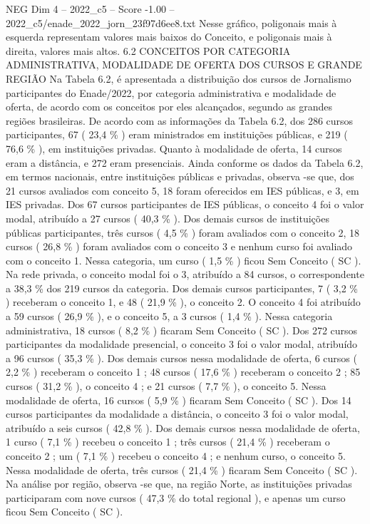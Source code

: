 \begin{textsample}{NEG Dim 4 – 2022\_c5 – Score -1.00 – 2022\_c5/enade\_2022\_jorn\_23f97d6ee8.txt}
Nesse gráfico, poligonais mais à esquerda representam valores mais baixos do Conceito, e poligonais mais à direita, valores mais altos. 6.2 CONCEITOS POR CATEGORIA ADMINISTRATIVA, MODALIDADE DE OFERTA DOS CURSOS E GRANDE REGIÃO Na Tabela 6.2, é apresentada a distribuição dos cursos de Jornalismo participantes do Enade/2022, por categoria administrativa e modalidade de oferta, de acordo com os conceitos por eles alcançados, segundo as grandes regiões brasileiras.
De acordo com as informações da Tabela 6.2, dos 286 cursos participantes, 67 ( 23,4 \% ) eram ministrados em instituições públicas, e 219 ( 76,6 \% ), em instituições privadas.
Quanto à modalidade de oferta, 14 cursos eram a distância, e 272 eram presenciais.
Ainda conforme os dados da Tabela 6.2, em termos nacionais, entre instituições públicas e privadas, observa -se que, dos 21 cursos avaliados com conceito 5, 18 foram oferecidos em IES públicas, e 3, em IES privadas.
Dos 67 cursos participantes de IES públicas, o conceito 4 foi o valor modal, atribuído a 27 cursos ( 40,3 \% ).
Dos demais cursos de instituições públicas participantes, três cursos ( 4,5 \% ) foram avaliados com o conceito 2, 18 cursos ( 26,8 \% ) foram avaliados com o conceito 3 e nenhum curso foi avaliado com o conceito 1.
Nessa categoria, um curso ( 1,5 \% ) ficou Sem Conceito ( SC ).
Na rede privada, o conceito modal foi o 3, atribuído a 84 cursos, o correspondente a 38,3 \% dos 219 cursos da categoria.
Dos demais cursos participantes, 7 ( 3,2 \% ) receberam o conceito 1, e 48 ( 21,9 \% ), o conceito 2.
O conceito 4 foi atribuído a 59 cursos ( 26,9 \% ), e o conceito 5, a 3 cursos ( 1,4 \% ).
Nessa categoria administrativa, 18 cursos ( 8,2 \% ) ficaram Sem Conceito ( SC ).
Dos 272 cursos participantes da modalidade presencial, o conceito 3 foi o valor modal, atribuído a 96 cursos ( 35,3 \% ).
Dos demais cursos nessa modalidade de oferta, 6 cursos ( 2,2 \% ) receberam o conceito 1 ; 48 cursos ( 17,6 \% ) receberam o conceito 2 ; 85 cursos ( 31,2 \% ), o conceito 4 ; e 21 cursos ( 7,7 \% ), o conceito 5.
Nessa modalidade de oferta, 16 cursos ( 5,9 \% ) ficaram Sem Conceito ( SC ).
Dos 14 cursos participantes da modalidade a distância, o conceito 3 foi o valor modal, atribuído a seis cursos ( 42,8 \% ).
Dos demais cursos nessa modalidade de oferta, 1 curso ( 7,1 \% ) recebeu o conceito 1 ; três cursos ( 21,4 \% ) receberam o conceito 2 ; um ( 7,1 \% ) recebeu o conceito 4 ; e nenhum curso, o conceito 5.
Nessa modalidade de oferta, três cursos ( 21,4 \% ) ficaram Sem Conceito ( SC ).
Na análise por região, observa -se que, na região Norte, as instituições privadas participaram com nove cursos ( 47,3 \% do total regional ), e apenas um curso ficou Sem Conceito ( SC ).

\end{textsample}
